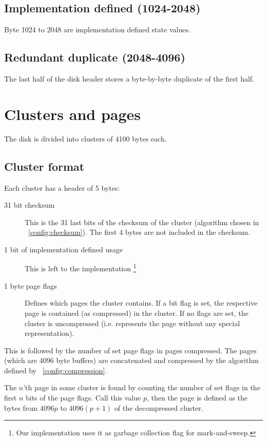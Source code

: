 \documentclass[11pt,a4paper]{report}
\begin{document}
        \subsection{Implementation defined (1024-2048)}
        Byte 1024 to 2048 are implementation defined state values.

        \subsection{Redundant duplicate (2048-4096)}
        The last half of the disk header stores a byte-by-byte duplicate of the
        first half.

    \section{Clusters and pages}
        The disk is divided into clusters of 4100 bytes each.

        \subsection{Cluster format}
        Each cluster has a header of 5 bytes:

        \begin{description}
            \item [31 bit checksum] This is the 31 last bits of the checksum of
                the cluster (algorithm chosen in ~\ref{config:checksum}). The
                first 4 bytes are not included in the checksum.
            \item [1 bit of implementation defined usage] This is left to the
                implementation \footnote{Our implementation uses it as garbage
                collection flag for mark-and-sweep.}
            \item [1 byte page flags] Defines which pages the cluster contains.
                If a bit flag is set, the respective page is contained (as
                compressed) in the cluster. If no flags are set, the cluster is
                uncompressed (i.e. represents the page without any special
                representation).
        \end{description}

        This is followed by the number of set page flags in pages compressed.
        The pages (which are 4096 byte buffers) are concatenated and compressed
        by the algorithm defined by ~\ref{config:compression}.

        The $n$'th page in some cluster is found by counting the number of set
        flags in the first $n$ bits of the page flags. Call this value $p$,
        then the page is defined as the bytes from $4096p$ to $4096(p + 1)$ of
        the decompressed cluster.
\end{document}
